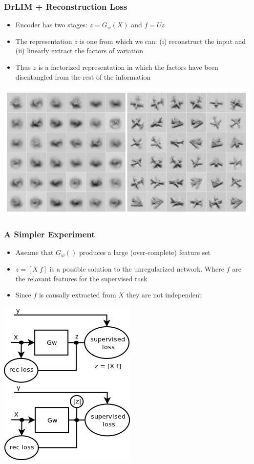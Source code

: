 \documentclass{beamer}
\begin{document}
\begin{frame}
\frametitle{DrLIM + Reconstruction Loss} 
\begin{itemize}
\item Encoder has two stages: $z=G_w(X)$ and $f=Uz$
\item The representation $z$ is one from which we can: (i) reconstruct the input and (ii) linearly extract the factors of variation 
\item Thus $z$ is a factorized representation in which the factors have been disentangled from the rest of the information
\end{itemize} 
\begin{center}
\includegraphics[scale = 0.3]{./figures/redrlim.png} 
\end{center} 
\end{frame} 

\begin{frame}
\frametitle{A Simpler Experiment} 
\begin{center} 
\begin{itemize}
\item Assume that $G_w()$ produces a large (over-complete) feature set
\item $z = [X~f]$ is a possible solution to the unregularized network. Where $f$ are the relavant features for the supervised task
\item Since $f$ is causally extracted from $X$ they are not independent
\end{itemize}

\includegraphics[scale = 0.4]{./figures/inv_vs_eqi.png} 
\end{center} 
\end{frame} 
\end{document}
